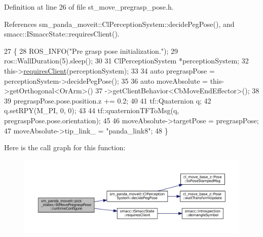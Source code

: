 Definition at line 26 of file st\+\_\+move\+\_\+pregrasp\+\_\+pose.\+h.



References sm\+\_\+panda\+\_\+moveit\+::\+Cl\+Perception\+System\+::decide\+Peg\+Pose(), and smacc\+::\+I\+Smacc\+State\+::requires\+Client().


\begin{DoxyCode}
27     \{
28         ROS\_INFO(\textcolor{stringliteral}{"Pre grasp pose initialization."});
29         ros::WallDuration(5).sleep();
30 
31         ClPerceptionSystem *perceptionSystem;
32         this->\hyperlink{classsmacc_1_1ISmaccState_a7f95c9f0a6ea2d6f18d1aec0519de4ac}{requiresClient}(perceptionSystem);
33 
34         \textcolor{keyword}{auto} pregraspPose = perceptionSystem->decidePegPose();
35 
36         \textcolor{keyword}{auto} moveAbsolute = this->getOrthogonal<OrArm>()
37                                 ->getClientBehavior<CbMoveEndEffector>();
38 
39         pregraspPose.pose.position.z += 0.2;
40 
41         tf::Quaternion q;
42         q.setRPY(M\_PI, 0, 0);
43 
44         tf::quaternionTFToMsg(q, pregraspPose.pose.orientation);
45 
46         moveAbsolute->targetPose = pregraspPose;
47         moveAbsolute->tip\_link\_ = \textcolor{stringliteral}{"panda\_link8"};
48     \}
\end{DoxyCode}
Here is the call graph for this function\+:
\nopagebreak
\begin{figure}[H]
\begin{center}
\leavevmode
\includegraphics[width=350pt]{structsm__panda__moveit_1_1pick__states_1_1StMovePregraspPose_a86eeebab43891031e12c917e513e1ee9_cgraph}
\end{center}
\end{figure}
\mbox{\label{structsm__panda__moveit_1_1pick__states_1_1StMovePregraspPose_a70150449245507a9770eca21a9d06ab7}} 
